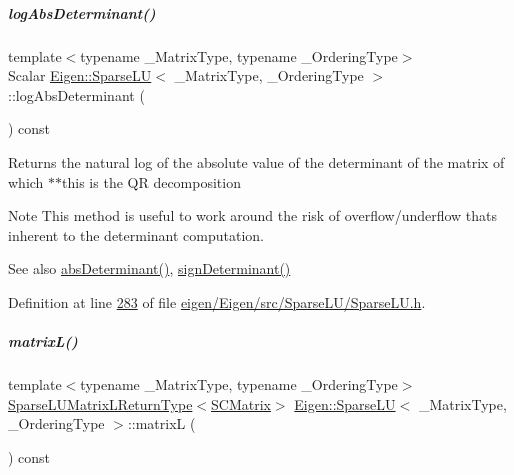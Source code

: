 \mbox{\label{group___sparse_l_u___module_a89e30a7df205596784a5a73f4768eaec}} 
\subparagraph{\texorpdfstring{log\+Abs\+Determinant()}{logAbsDeterminant()}\hspace{0.1cm}{\footnotesize\ttfamily [2/2]}}
{\footnotesize\ttfamily template$<$typename \+\_\+\+Matrix\+Type, typename \+\_\+\+Ordering\+Type$>$ \\
Scalar \hyperlink{group___sparse_l_u___module_class_eigen_1_1_sparse_l_u}{Eigen\+::\+Sparse\+LU}$<$ \+\_\+\+Matrix\+Type, \+\_\+\+Ordering\+Type $>$\+::log\+Abs\+Determinant (\begin{DoxyParamCaption}{ }\end{DoxyParamCaption}) const\hspace{0.3cm}{\ttfamily [inline]}}

\begin{DoxyReturn}{Returns}
the natural log of the absolute value of the determinant of the matrix of which $\ast$$\ast$this is the QR decomposition
\end{DoxyReturn}
\begin{DoxyNote}{Note}
This method is useful to work around the risk of overflow/underflow that\textquotesingle{}s inherent to the determinant computation.
\end{DoxyNote}
\begin{DoxySeeAlso}{See also}
\hyperlink{group___sparse_l_u___module_a06fa89424239fb169d408f08252426d0}{abs\+Determinant()}, \hyperlink{group___sparse_l_u___module_a6651143e3b18fa90cfb3808b6fd23c4e}{sign\+Determinant()} 
\end{DoxySeeAlso}


Definition at line \hyperlink{eigen_2_eigen_2src_2_sparse_l_u_2_sparse_l_u_8h_source_l00283}{283} of file \hyperlink{eigen_2_eigen_2src_2_sparse_l_u_2_sparse_l_u_8h_source}{eigen/\+Eigen/src/\+Sparse\+L\+U/\+Sparse\+L\+U.\+h}.

\mbox{\label{group___sparse_l_u___module_a634abe55e5a076f2e10db78871105a8f}} 
\subparagraph{\texorpdfstring{matrix\+L()}{matrixL()}\hspace{0.1cm}{\footnotesize\ttfamily [1/2]}}
{\footnotesize\ttfamily template$<$typename \+\_\+\+Matrix\+Type, typename \+\_\+\+Ordering\+Type$>$ \\
\hyperlink{struct_eigen_1_1_sparse_l_u_matrix_l_return_type}{Sparse\+L\+U\+Matrix\+L\+Return\+Type}$<$\hyperlink{group___sparse_l_u___module}{S\+C\+Matrix}$>$ \hyperlink{group___sparse_l_u___module_class_eigen_1_1_sparse_l_u}{Eigen\+::\+Sparse\+LU}$<$ \+\_\+\+Matrix\+Type, \+\_\+\+Ordering\+Type $>$\+::matrixL (\begin{DoxyParamCaption}{ }\end{DoxyParamCaption}) const\hspace{0.3cm}{\ttfamily [inline]}}

